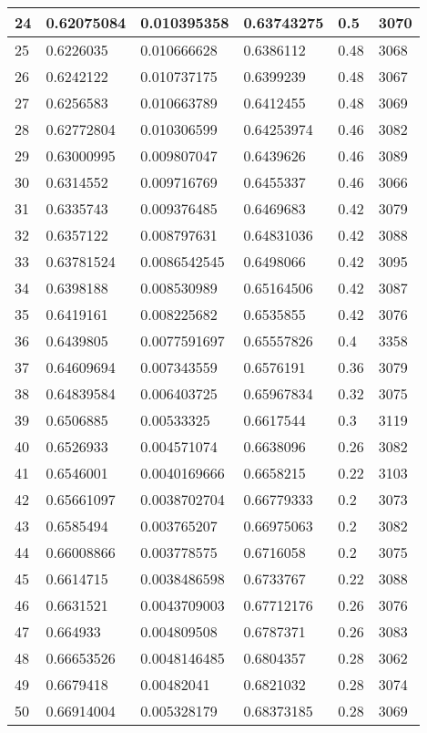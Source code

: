 \begin{longtable}{|l|l|l|l|l|l|}
24 & 0.62075084 & 0.010395358 & 0.63743275 & 0.5 & 3070 \\ \hline 
25 & 0.6226035 & 0.010666628 & 0.6386112 & 0.48 & 3068 \\ \hline 
26 & 0.6242122 & 0.010737175 & 0.6399239 & 0.48 & 3067 \\ \hline 
27 & 0.6256583 & 0.010663789 & 0.6412455 & 0.48 & 3069 \\ \hline 
28 & 0.62772804 & 0.010306599 & 0.64253974 & 0.46 & 3082 \\ \hline 
29 & 0.63000995 & 0.009807047 & 0.6439626 & 0.46 & 3089 \\ \hline 
30 & 0.6314552 & 0.009716769 & 0.6455337 & 0.46 & 3066 \\ \hline 
31 & 0.6335743 & 0.009376485 & 0.6469683 & 0.42 & 3079 \\ \hline 
32 & 0.6357122 & 0.008797631 & 0.64831036 & 0.42 & 3088 \\ \hline 
33 & 0.63781524 & 0.0086542545 & 0.6498066 & 0.42 & 3095 \\ \hline 
34 & 0.6398188 & 0.008530989 & 0.65164506 & 0.42 & 3087 \\ \hline 
35 & 0.6419161 & 0.008225682 & 0.6535855 & 0.42 & 3076 \\ \hline 
36 & 0.6439805 & 0.0077591697 & 0.65557826 & 0.4 & 3358 \\ \hline 
37 & 0.64609694 & 0.007343559 & 0.6576191 & 0.36 & 3079 \\ \hline 
38 & 0.64839584 & 0.006403725 & 0.65967834 & 0.32 & 3075 \\ \hline 
39 & 0.6506885 & 0.00533325 & 0.6617544 & 0.3 & 3119 \\ \hline 
40 & 0.6526933 & 0.004571074 & 0.6638096 & 0.26 & 3082 \\ \hline 
41 & 0.6546001 & 0.0040169666 & 0.6658215 & 0.22 & 3103 \\ \hline 
42 & 0.65661097 & 0.0038702704 & 0.66779333 & 0.2 & 3073 \\ \hline 
43 & 0.6585494 & 0.003765207 & 0.66975063 & 0.2 & 3082 \\ \hline 
44 & 0.66008866 & 0.003778575 & 0.6716058 & 0.2 & 3075 \\ \hline 
45 & 0.6614715 & 0.0038486598 & 0.6733767 & 0.22 & 3088 \\ \hline 
46 & 0.6631521 & 0.0043709003 & 0.67712176 & 0.26 & 3076 \\ \hline 
47 & 0.664933 & 0.004809508 & 0.6787371 & 0.26 & 3083 \\ \hline 
48 & 0.66653526 & 0.0048146485 & 0.6804357 & 0.28 & 3062 \\ \hline 
49 & 0.6679418 & 0.00482041 & 0.6821032 & 0.28 & 3074 \\ \hline 
50 & 0.66914004 & 0.005328179 & 0.68373185 & 0.28 & 3069 \\ \hline 
\end{longtable}